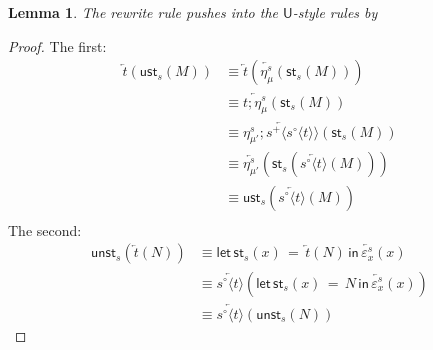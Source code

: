 \documentclass[10pt]{article}
\newtheorem{lemma}{Lemma}
\theoremstyle{definition}
\newcommand{\rewrite}[2]{\overleftarrow{#1}(#2)}
\newcommand\StI[2]{\ensuremath{\mathsf{st}_{#1}(#2)}}
\newcommand\UStI[2]{\ensuremath{\mathsf{ust}_{#1}(#2)}}
\newcommand\UnSt[2]{\ensuremath{\mathsf{unst}_{#1}(#2)}}
\newcommand\StE[4]{\ensuremath{\mathsf{let} \, \StI{#1}{#3} \, = \, {#2} \, \mathsf{in} \, #4}}
\newcommand\ap[2]{\ensuremath{#1 \langle #2 \rangle }}
\newcommand\ApPlus[2]{\ensuremath{{#1}^+ \langle #2 \rangle }}
\newcommand\ApCirc[2]{\ensuremath{{#1}^\circ \langle #2 \rangle }}
\begin{document}
\begin{lemma}
The rewrite rule pushes into the $\mathsf{U}$-style rules by
\end{lemma}
\begin{proof}
The first:
\begin{align*}
\rewrite{t}{\UStI{s}{M}}
&\equiv \rewrite{t}{\rewrite{\eta^s_\mu}{\StI{s}{M}}} \\
&\equiv \rewrite{t;\eta^s_\mu}{\StI{s}{M}} \\
&\equiv \rewrite{\eta^s_{\mu'};\ApPlus{s}{\ApCirc{s}{t}}}{\StI{s}{M}} \\
&\equiv \rewrite{\eta^s_{\mu'}}{\StI{s}{\rewrite{\ApCirc{s}{t}}{M}}} \\
&\equiv \UStI{s}{\rewrite{\ApCirc{s}{t}}{M}} \\
\end{align*}
The second:
\begin{align*}
\UnSt{s}{\rewrite{t}{N}} 
&\equiv \StE{s}{\rewrite{t}{N}}{x}{\rewrite{\varepsilon^s_x}{x}} \\
&\equiv \rewrite{\ApCirc{s}{t}}{\StE{s}{N}{x}{\rewrite{\varepsilon^s_x}{x}}} \\
&\equiv \rewrite{\ApCirc{s}{t}}{\UnSt{s}{N}}
\end{align*}
\end{proof}
\end{document}
